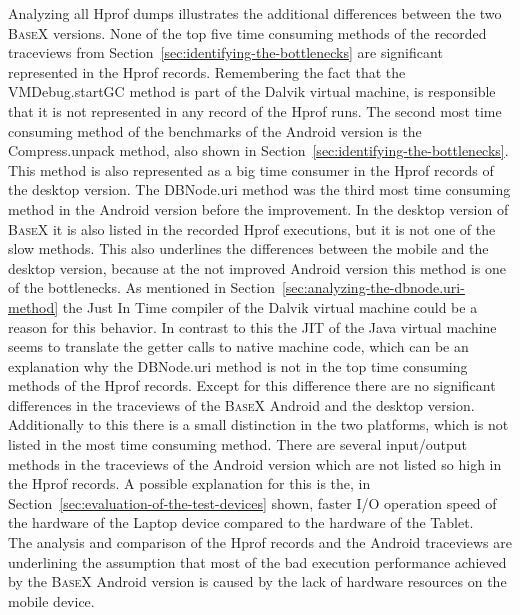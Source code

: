 Analyzing all Hprof dumps illustrates the additional differences between the two \textsc{BaseX} versions.
None of the top five time consuming methods of the recorded traceviews from Section~\ref{sec:identifying-the-bottlenecks} are significant represented in the Hprof records.
Remembering the fact that the \textsf{VMDebug.startGC} method is part of the Dalvik virtual machine, is responsible that it is not represented in any record of the Hprof runs.
The second most time consuming method of the benchmarks of the Android version is the \textsf{Compress.unpack} method, also shown in Section~\ref{sec:identifying-the-bottlenecks}.
This method is also represented as a big time consumer in the Hprof records of the desktop version.
The \textsf{DBNode.uri} method was the third most time consuming method in the Android version before the improvement.
In the desktop version of \textsc{BaseX} it is also listed in the recorded Hprof executions, but it is not one of the slow methods.
This also underlines the differences between the mobile and the desktop version, because at the not improved Android version this method is one of the bottlenecks.
As mentioned in Section~\ref{sec:analyzing-the-dbnode.uri-method} the Just In Time compiler of the Dalvik virtual machine could be a reason for this behavior.
In contrast to this the JIT of the Java virtual machine seems to translate the getter calls to native machine code, which can be an explanation why the \textsf{DBNode.uri} method is not in the top time consuming methods of the Hprof records.
Except for this difference there are no significant differences in the traceviews of the \textsc{BaseX} Android and the desktop version.
Additionally to this there is a small distinction in the two platforms, which is not listed in the most time consuming method.
There are several input/output methods in the traceviews of the Android version which are not listed so high in the Hprof records.
A possible explanation for this is the, in Section~\ref{sec:evaluation-of-the-test-devices} shown, faster I/O operation speed of the hardware of the Laptop device compared to the hardware of the Tablet.\\
The analysis and comparison of the Hprof records and the Android traceviews are underlining the assumption that most of the bad execution performance achieved by the \textsc{BaseX} Android version is caused by the lack of hardware resources on the mobile device.




